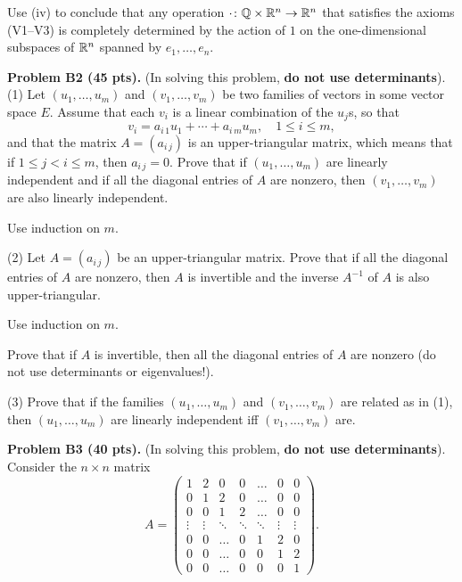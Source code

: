\documentclass[12pt]{article}
\begin{document}
\medskip
Use (iv) to conclude that any operation
$\cdot\colon \mathbb{Q}\times  \mathbb{R}^n\rightarrow \mathbb{R}^n$
that satisfies the axioms (V1--V3) is completely determined
by the action of $1$ on the  one-dimensional subspaces of $\mathbb{R}^n$ spanned by
$e_1, \ldots, e_n$.



\vspace {0.25cm}\noindent
{\bf Problem B2 (45 pts).} (In solving this problem, {\bf do not use determinants}).
(1)
Let $(u_1, \ldots, u_m)$ and $(v_1, \ldots, v_m)$ be two families of 
vectors in some vector space $E$. Assume that
each $v_i$ is a linear combination
of the $u_j$s, so that
\[
v_i = a_{i\, 1}u_1 + \cdots + a_{i\, m}u_m,
\quad 1 \leq i \leq m,
\]
and that the matrix $A = (a_{i\, j})$ is an upper-triangular matrix,
which means that if  $1\leq j < i \leq m$, then $a_{i\, j} = 0$. 
Prove that if $(u_1, \ldots, u_m)$ are linearly independent and if
all the diagonal entries of $A$ are nonzero, then
$(v_1, \ldots, v_m)$ are also linearly independent.


\medskip
\hint
Use induction on $m$.


\medskip
(2)
Let $A = (a_{i\, j})$ be an upper-triangular matrix. Prove that
if all the diagonal entries of $A$ are nonzero, then $A$ is invertible and
the inverse $A^{-1}$  of $A$ is also upper-triangular.

\medskip
\hint
Use induction on $m$.

\medskip
Prove that if $A$ is invertible, then all the 
diagonal entries of $A$ are nonzero (do not use determinants or 
eigenvalues!).

\medskip
(3)
Prove that if the families
$(u_1, \ldots, u_m)$ and $(v_1, \ldots, v_m)$ are related as 
in (1), then $(u_1, \ldots, u_m)$ are linearly independent iff
$(v_1, \ldots, v_m)$ are.



\vspace {0.25cm}\noindent
{\bf Problem B3 (40 pts).} (In solving this problem, {\bf do not use determinants}).
Consider the $n \times n$ matrix
\[
A =
\begin{pmatrix}
1 & 2 & 0  & 0 & \ldots & 0 & 0\\
0 & 1 & 2  & 0 & \ldots & 0 & 0\\
0 & 0 & 1  & 2 & \ldots & 0 & 0\\
\vdots &\vdots & \ddots & \ddots& \ddots&\vdots&\vdots \\
0 & 0 & \ldots &  0 & 1 &  2 & 0 \\
0 & 0 & \ldots &  0 & 0 &  1 & 2 \\
0 & 0 & \ldots &  0 & 0 &  0 & 1
\end{pmatrix}.
\]
\end{document}
